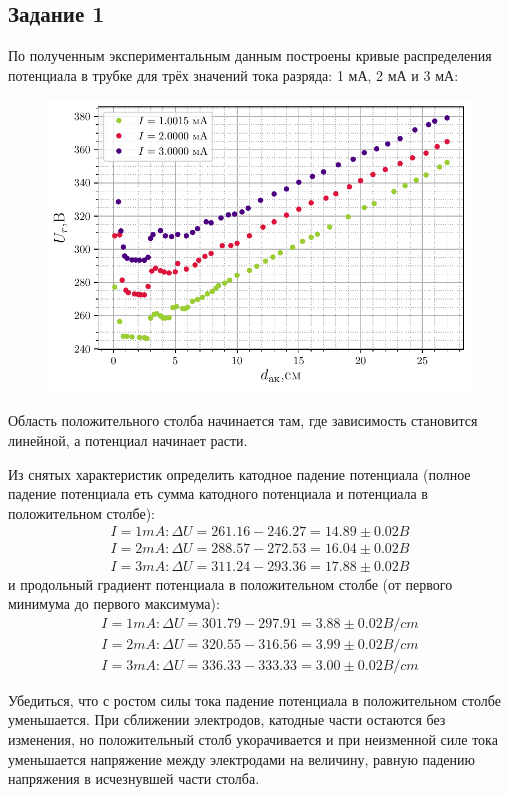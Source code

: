 \subsection{Задание 1}
По полученным экспериментальным данным построены кривые распределения потенциала в трубке для трёх значений тока 
разряда: 1 мА, 2 мА и 3 мА:
\begin{figure}[H]
	\centering
    \includegraphics[width=0.75\linewidth]{scripts/fig1}
	\caption{}
	\label{fig:5}
\end{figure}

Область положительного столба начинается там, где зависимость становится 
линейной, а потенциал начинает расти.

Из снятых характеристик определить катодное падение потенциала (полное 
падение потенциала еть сумма катодного потенциала и потенциала в 
положительном столбе):
\begin{gather*}
	I = 1 mA: \Delta U = 261.16-246.27=14.89 \pm 0.02 B \\ 
	I = 2 mA: \Delta U = 288.57-272.53=16.04 \pm 0.02 B \\
	I = 3 mA: \Delta U = 311.24-293.36=17.88 \pm 0.02 B 
\end{gather*}
и продольный градиент потенциала в положительном столбе (от первого 
минимума до первого максимума):
\begin{gather*}
	I = 1 mA: \Delta U = 301.79-297.91=3.88 \pm 0.02 B/cm \\
	I = 2 mA: \Delta U = 320.55-316.56=3.99 \pm 0.02 B/cm \\
	I = 3 mA: \Delta U = 336.33-333.33=3.00 \pm 0.02 B/cm
\end{gather*}

Убедиться, что с ростом силы тока падение потенциала в положительном 
столбе уменьшается. При сближении электродов, катодные части остаются 
без изменения, но положительный столб укорачивается и при неизменной 
силе тока уменьшается напряжение между электродами на величину, равную 
падению напряжения в исчезнувшей части столба.

